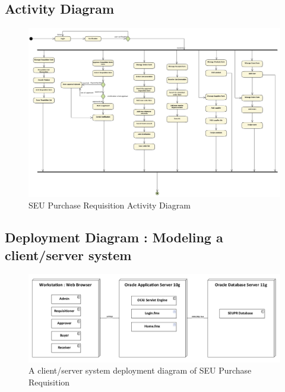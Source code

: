 \documentclass[12pt]{report} %
\begin{document}
\ifx
{}
\begin{landscape}
\subsection{Activity Diagram}
\begin{figure}[h]

	\begin{center}
	\includegraphics[width=1.06\textwidth]{pic/Activity/seupr_full_activity.png}
	\end{center}
	\caption{SEU Purchase Requisition Activity Diagram}
	\label{fig:activity}
\end{figure}
\thispagestyle{empty} 
\end{landscape}

\restoregeometry
\fi




\subsection{Deployment Diagram : Modeling a client/server system}

\begin{figure}[h]
	\includegraphics[width=1.1\textwidth]{pic/deployment/client_server.png}
	\caption{A client/server system deployment diagram of SEU Purchase Requisition}
	\label{fig:client_server}
\end{figure}
\end{document}

